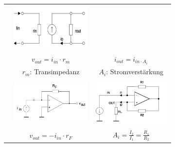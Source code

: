 \begin{tabular}{|c|c|c|}
									& \includegraphics[width=4cm,trim=0 0 0 -5]{./images/cccs.png}					\\ \cline{2-3}
									& $v_{out}=i_{in} \cdot r_m$			& $i_{out} = i_{in \cdot A_i}$			\\
									& $r_m$: Transimpedanz					& $A_i$: Stromverstärkung				\\ \cline{2-3}
									& \includegraphics[width=4cm,trim=0 0 0 -5]{./images/tia.png}
									& \includegraphics[width=4cm,trim=0 0 0 -5]{./images/cccs-schaltung.png}		\\ 
									& $v_{out}=-i_{in} \cdot r_F$			& $A_i=\frac{I_2}{I_1}=\frac{R_1}{R_2}$	\\ \hline
									
				
			\end{tabular} \\
